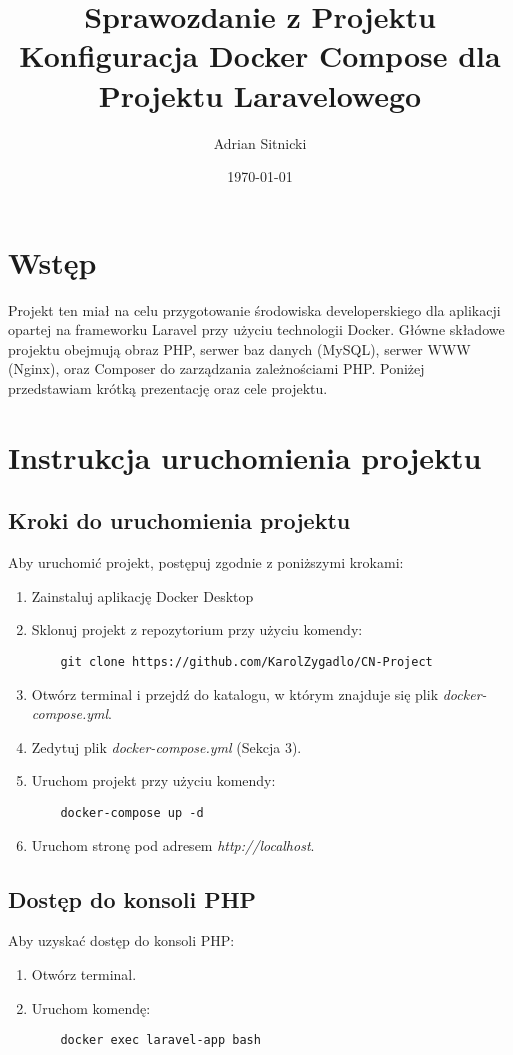 \documentclass{article}
\title{Sprawozdanie z Projektu \\ Konfiguracja Docker Compose dla Projektu Laravelowego}
\author{Adrian Sitnicki}
\date{\today}
\begin{document}
\maketitle

\section{Wstęp}
Projekt ten miał na celu przygotowanie środowiska developerskiego dla aplikacji opartej na frameworku Laravel przy użyciu technologii Docker. Główne składowe projektu obejmują obraz PHP, serwer baz danych (MySQL), serwer WWW (Nginx), oraz Composer do zarządzania zależnościami PHP. Poniżej przedstawiam krótką prezentację oraz cele projektu.

\section{Instrukcja uruchomienia projektu}
\subsection{Kroki do uruchomienia projektu}
Aby uruchomić projekt, postępuj zgodnie z poniższymi krokami:
\begin{enumerate}
    \item Zainstaluj aplikację Docker Desktop
    \item Sklonuj projekt z repozytorium przy użyciu komendy:
    \begin{verbatim}
    git clone https://github.com/KarolZygadlo/CN-Project
    \end{verbatim}
    \item Otwórz terminal i przejdź do katalogu, w którym znajduje się plik \textit{docker-compose.yml}.
    \item Zedytuj plik \textit{docker-compose.yml} (Sekcja 3).
    \item Uruchom projekt przy użyciu komendy:
    \begin{verbatim}
    docker-compose up -d
    \end{verbatim}
    \item Uruchom stronę pod adresem \textit{http://localhost}.
\end{enumerate}

\subsection{Dostęp do konsoli PHP}
Aby uzyskać dostęp do konsoli PHP:
\begin{enumerate}
    \item Otwórz terminal.
    \item Uruchom komendę:
    \begin{verbatim}
    docker exec laravel-app bash
    \end{verbatim}
\end{enumerate}
\end{document}
